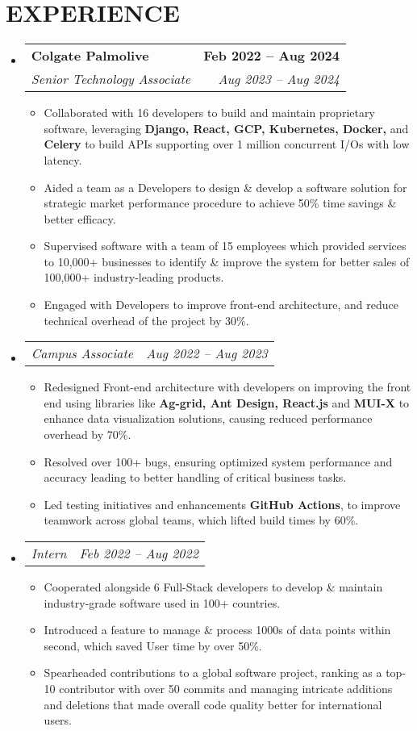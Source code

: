\documentclass[letterpaper,10pt]{article}
\makeatletter
\newcommand{\resumeItem}[1]{
  \item\small{
    {#1 \vspace{-2pt}}
  }
}
\newcommand{\resumeSubheading}[4]{
  \vspace{2pt}\item
    \begin{tabular*}{1.0\textwidth}[t]{l@{\extracolsep{\fill}}r}
      \textbf{\large#1} & \textbf{\normalsize #2} \\
      \textit{\large#3} & \textit{\small #4} \\
    \end{tabular*}\vspace{-7pt}
}
\newcommand{\resumeSubSubheading}[2]{
  \vspace{-6pt}\item
    \begin{tabular*}{1.0\textwidth}[t]{l@{\extracolsep{\fill}}r}
      \textit{\large#1} & \textit{\small #2} \\
    \end{tabular*}\vspace{-7pt}
}
\newcommand{\resumeSubHeadingListStart}{\begin{itemize}[leftmargin=0.0in, label={}]}
\newcommand{\resumeSubHeadingListEnd}{\end{itemize}}
\newcommand{\resumeItemListStart}{\begin{itemize}}
\newcommand{\resumeItemListEnd}{\end{itemize}\vspace{-5pt}}
\makeatother
\begin{document}
\section{EXPERIENCE}
\resumeSubHeadingListStart
    \resumeSubheading{Colgate Palmolive 
    \href{https://drive.google.com/file/d/1Bn6h0GvFtkDxE25o8SCpva6-QOglHDiO/view?usp=drive_link}{\raisebox{-0.1\height}\faExternalLink }
    }{Feb 2022 -- Aug 2024}
    {Senior Technology Associate}{Aug 2023 -- Aug 2024}
    \resumeItemListStart
        \resumeItem{\normalsize{Collaborated with 16 developers to build and maintain proprietary software, leveraging \textbf{Django, React, GCP, Kubernetes, Docker,} and \textbf{Celery} to build APIs supporting over 1 million concurrent I/Os with low latency.}}
        \resumeItem{\normalsize{Aided a team as a Developers to design \& develop a software solution for strategic market performance procedure to achieve 50\% time savings \& better efficacy.}}
        \resumeItem{\normalsize{Supervised software with a team of 15 employees which provided services to 10,000+ businesses to identify \& improve the system for better sales of 100,000+ industry-leading products.}}
        \resumeItem{\normalsize{Engaged with Developers to improve front-end architecture, and reduce technical overhead of the project by 30\%.}}
    \resumeItemListEnd
    \resumeSubSubheading{Campus Associate}{Aug 2022 -- Aug 2023}
    \resumeItemListStart
        \resumeItem{\normalsize{Redesigned Front-end architecture with developers on improving the front end using libraries like \textbf{Ag-grid, Ant Design, React.js} and \textbf{MUI-X} to enhance data visualization solutions, causing reduced performance overhead by 70\%.}}
        \resumeItem{\normalsize{Resolved over 100+ bugs, ensuring optimized system performance and accuracy leading to better handling of critical business tasks.}}
        \resumeItem{\normalsize{Led testing initiatives and enhancements \textbf{GitHub Actions}, to improve teamwork across global teams, which lifted build times by 60\%.}}
    \resumeItemListEnd
    \resumeSubSubheading{Intern}{Feb 2022 -- Aug 2022}
    \resumeItemListStart
        \resumeItem{\normalsize{Cooperated alongside 6 Full-Stack developers to develop \& maintain industry-grade software used in 100+ countries.}}
        \resumeItem{\normalsize{Introduced a feature to manage \& process 1000s of data points within second, which saved User time by over 50\%.}}
        \resumeItem{\normalsize{Spearheaded contributions to a global software project, ranking as a top-10 contributor with over 50 commits and managing intricate additions and deletions that made overall code quality better for international users.}}
    \resumeItemListEnd
\resumeSubHeadingListEnd
\vspace{-12pt}
\end{document}
